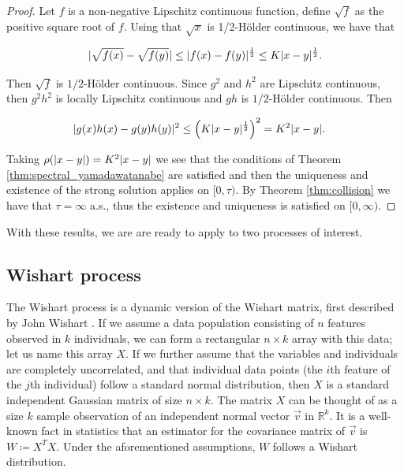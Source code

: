 \begin{proof}
    Let $f$ is a non-negative Lipschitz continuous function, define $\sqrt f$ as the positive square root of $f$. Using that $\sqrt x$ is 1/2-Hölder continuous, we have that

    \begin{equation*}
        \lvert  \sqrt{f(x)} - \sqrt{f(y)}   \rvert \le \lvert  f(x) - f(y)  \rvert^{\frac12}  \le K \lvert x-y \rvert^{\frac12}.
    \end{equation*}

    
    
    Then $\sqrt f$ is $1/2$-Hölder continuous. Since $g^2$ and $h^2$ are Lipschitz continuous, then $g^2h^2$ is locally Lipschitz continuous and $gh$ is $1/2$-Hölder continuous. Then

    \begin{align*}
        \lvert g(x)h(x) - g(y)h(y) \rvert^2 &\le \left( K\lvert x-y \rvert^{\frac12} \right)^2 = K^2 \lvert x-y \rvert.
    \end{align*}

    Taking $\rho(|x-y|) = K^2\lvert x-y \rvert$ we see that the conditions of Theorem \ref{thm:spectral_yamadawatanabe} are satisfied and then the uniqueness and existence of the strong solution applies on $[0,\tau)$. By Theorem \ref{thm:collision} we have that $\tau=\infty$ a.s., thus the existence and uniqueness is satisfied on $[0,\infty)$.
\end{proof}

With these results, we are are ready to apply to two processes of interest.


\subsection{Wishart process}

The Wishart process is a dynamic version of the Wishart matrix, first described by John Wishart \cite{article:wishart}. If we assume a data population consisting of \(n\) features observed in \(k\) individuals, we can form a rectangular \(n \times k\) array with this data; let us name this array \(X\). If we further assume that the variables and individuals are completely uncorrelated, and that individual data points (the \(i\)th feature of the \(j\)th individual) follow a standard normal distribution, then \(X\) is a standard independent Gaussian matrix of size \(n \times k\). The matrix \(X\) can be thought of as a size \(k\) sample observation of an independent normal vector \(\vec{v}\) in \(\mathbb{R}^k\). It is a well-known fact in statistics that an estimator for the covariance matrix of \(\vec{v}\) is \(W \coloneqq X^TX\). Under the aforementioned assumptions, \(W\) follows a Wishart distribution.

